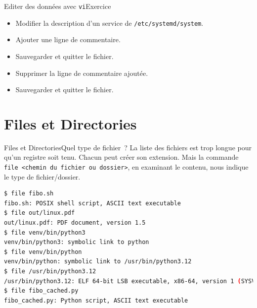 \documentclass{beamer}
\begin{document}
    \begin{frame}{Editer des données avec \lstinline{vi}}{Exercice \execcounterdispinc}
        \begin{itemize}
            \item Modifier la description d'un service de \lstinline{/etc/systemd/system}.
            \item Ajouter une ligne de commentaire.
            \item Sauvegarder et quitter le fichier.
            \item Supprimer la ligne de commentaire ajoutée.
            \item Sauvegarder et quitter le fichier.
        \end{itemize}
    \end{frame}


    \section{Files et Directories}\label{sec:files-directories}

    \begin{frame}[fragile]{Files et Directories}{Quel type de fichier~?}
        La liste des fichiers est trop longue pour qu'un registre soit tenu.
        Chacun peut créer son extension.
        Mais la commande \lstinline{file <chemin du fichier ou dossier>}, en examinant le contenu, nous indique le type de fichier/dossier.
        \begin{lstlisting}[language=bash]
$ file fibo.sh
fibo.sh: POSIX shell script, ASCII text executable
$ file out/linux.pdf
out/linux.pdf: PDF document, version 1.5
$ file venv/bin/python3
venv/bin/python3: symbolic link to python
$ file venv/bin/python
venv/bin/python: symbolic link to /usr/bin/python3.12
$ file /usr/bin/python3.12
/usr/bin/python3.12: ELF 64-bit LSB executable, x86-64, version 1 (SYSV), dynamically linked, interpreter /lib64/ld-linux-x86-64.so.2, BuildID[sha1]=ccd329aaf9256b96135a9e3f97cbf4c3829377e1, for GNU/Linux 3.2.0, stripped
$ file fibo_cached.py
fibo_cached.py: Python script, ASCII text executable
        \end{lstlisting}
    \end{frame}
\end{document}
